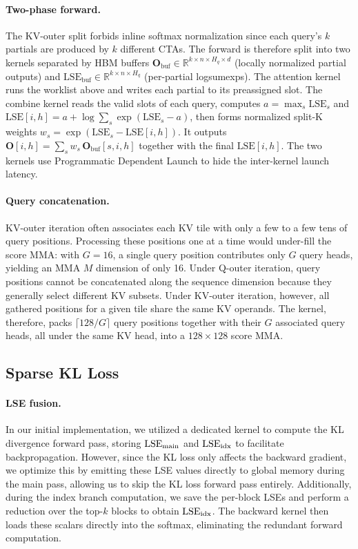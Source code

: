 \paragraph{Two-phase forward.}
The KV-outer split forbids inline softmax normalization since each query's $k$ partials are produced by $k$ different CTAs. The forward is therefore split into two kernels separated by HBM buffers $\mathbf{O}_\text{buf} \in \mathbb{R}^{k \times n \times H_q \times d}$ (locally normalized partial outputs) and $\mathrm{LSE}_\text{buf} \in \mathbb{R}^{k \times n \times H_q}$ (per-partial logsumexps). The attention kernel runs the worklist above and writes each partial to its preassigned slot. The combine kernel reads the valid slots of each query, computes $a = \max_s \mathrm{LSE}_s$ and $\mathrm{LSE}[i, h] = a + \log \sum_s \exp(\mathrm{LSE}_s - a)$, then forms normalized split-K weights $w_s = \exp(\mathrm{LSE}_s - \mathrm{LSE}[i, h])$. It outputs $\mathbf{O}[i, h] = \sum_s w_s\, \mathbf{O}_\text{buf}[s, i, h]$ together with the final $\mathrm{LSE}[i, h]$. The two kernels use Programmatic Dependent Launch to hide the inter-kernel launch
latency.


\paragraph{Query concatenation.}
KV-outer iteration often associates each KV tile with only a few to a few tens of query positions. Processing these positions one at a time would under-fill the score MMA: with $G = 16$, a single query position contributes only $G$ query heads, yielding an MMA $M$ dimension of only 16. Under Q-outer iteration, query positions cannot be concatenated along the sequence dimension because they generally select different KV subsets. Under KV-outer iteration, however, all gathered positions for a given tile share the same KV operands. The kernel, therefore, packs $\lceil 128/G \rceil$ query positions together with their $G$ associated query heads, all under the same KV head, into a $128 \times 128$ score MMA.

\subsection{Sparse KL Loss}
\label{sec:kernel:sparse_kl}

\paragraph{LSE fusion.}
In our initial implementation, we utilized a dedicated kernel to compute the KL divergence forward pass, storing $\mathrm{LSE}_{\rm main}$ and $\mathrm{LSE}_{\rm idx}$ to facilitate backpropagation. However, since the KL loss only affects the backward gradient, we optimize this by emitting these LSE values directly to global memory during the main pass, allowing us to skip the KL loss forward pass entirely. Additionally, during the index branch computation, we save the per-block LSEs and perform a reduction over the top-$k$ blocks to obtain $\mathrm{LSE}_{\rm idx}$. The backward kernel then loads these scalars directly into the softmax, eliminating the redundant forward computation.

